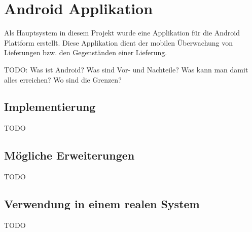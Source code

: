 \section{Android Applikation}
\label{sec:android}

Als Hauptsystem in diesem Projekt wurde eine Applikation für die Android
	Plattform erstellt. Diese Applikation dient der mobilen Überwachung
	von Lieferungen bzw. den Gegenständen einer Lieferung.

TODO: Was ist Android? Was sind Vor- und Nachteile? Was kann man damit alles
	erreichen? Wo sind die Grenzen?
	
\subsection{Implementierung}

TODO

\subsection{Mögliche Erweiterungen}

TODO

\subsection{Verwendung in einem realen System}

TODO